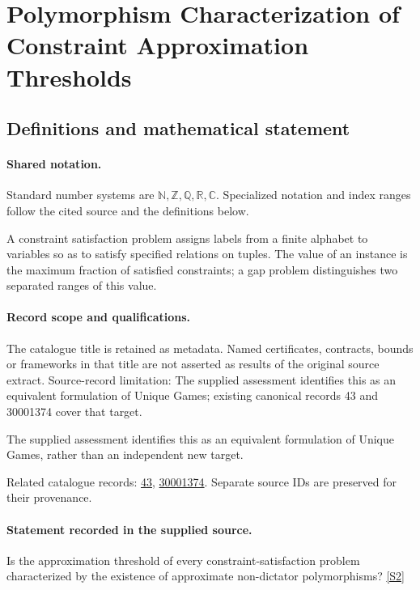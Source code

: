 \documentclass[11pt]{article}
\newcommand{\sref}[2]{\hyperlink{source:#1:#2}{[S#2]}}
\begin{document}
\section{Polymorphism Characterization of Constraint Approximation Thresholds}\label{statement}

\subsection{Definitions and mathematical statement}

\paragraph{Shared notation.}Standard number systems are $\mathbb N,\mathbb Z,\mathbb Q,\mathbb R,\mathbb C$. Specialized notation and index ranges follow the cited source and the definitions below.


A constraint satisfaction problem assigns labels from a finite alphabet to variables so as to satisfy specified relations on tuples. The value of an instance is the maximum fraction of satisfied constraints; a gap problem distinguishes two separated ranges of this value.
\paragraph{Record scope and qualifications.}
The catalogue title is retained as metadata. Named certificates, contracts, bounds or frameworks in that title are not asserted as results of the original source extract.
Source-record limitation: The supplied assessment identifies this as an equivalent formulation of Unique Games; existing canonical records 43 and 30001374 cover that target.

The supplied assessment identifies this as an equivalent formulation of Unique Games, rather than an independent new target.

Related catalogue records: \href{https://mehmetmars7.github.io/Erdosproblems-llm-hunter/problem.html?type=open_problems&id=43}{43}, \href{https://mehmetmars7.github.io/Erdosproblems-llm-hunter/problem.html?type=open_problems&id=30001374}{30001374}. Separate source IDs are preserved for their provenance.
\paragraph{Statement recorded in the supplied source.}
Is the approximation threshold of every constraint-satisfaction problem characterized by the existence of approximate non-dictator polymorphisms? \sref{statement}{2}
\end{document}
